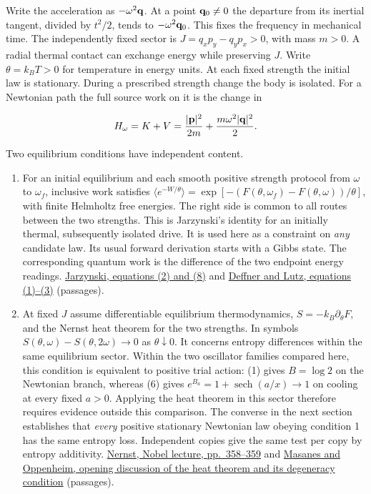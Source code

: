 \documentclass[11pt,a4paper]{article}
\newcommand{\tightlist}{\setlength{\itemsep}{0pt}\setlength{\parskip}{0pt}}
\begin{document}
Write the acceleration as \(-\omega^2 {\bf q}\). At a point
\({\bf q}_0\ne0\) the departure from its inertial tangent, divided by
\(t^2/2\), tends to \(-\omega^2{\bf q}_0\). This fixes the frequency in
mechanical time. The independently fixed sector is
\(J=q_xp_y-q_yp_x>0\), with mass \(m>0\). A radial thermal contact can
exchange energy while preserving \(J\). Write \(\theta=k_BT>0\) for
temperature in energy units. At each fixed strength the initial law is
stationary. During a prescribed strength change the body is isolated.
For a Newtonian path the full source work on it is the change in

\[
 H_\omega=K+V=\frac{|{\bf p}|^2}{2m}
                 +\frac{m\omega^2|{\bf q}|^2}{2}.
\]

Two equilibrium conditions have independent content.

\begin{enumerate}
\def\labelenumi{\arabic{enumi}.}
\tightlist
\item
  For an initial equilibrium and each smooth positive strength protocol
  from \(\omega\) to \(\omega_f\), inclusive work satisfies
  \(\langle e^{-W/\theta}\rangle=\exp[-(F(\theta,\omega_f)-
  F(\theta,\omega))/\theta]\), with finite Helmholtz free energies. The
  right side is common to all routes between the two strengths. This is
  Jarzynski's identity for an initially thermal, subsequently isolated
  drive. It is used here as a constraint on \emph{any} candidate law.
  Its usual forward derivation starts with a Gibbs state. The
  corresponding quantum work is the difference of the two endpoint
  energy readings.
  \href{https://arxiv.org/pdf/cond-mat/9610209}{Jarzynski, equations (2)
  and (8)} and \href{https://arxiv.org/pdf/0711.3914}{Deffner and Lutz,
  equations (1)--(3)} (passages).
\item
  At fixed \(J\) assume differentiable equilibrium thermodynamics,
  \(S=-k_B\partial_\theta F\), and the Nernst heat theorem for the two
  strengths. In symbols \(S(\theta,\omega)-S(\theta,2\omega)\to0\) as
  \(\theta\downarrow0\). It concerns entropy differences within the same
  equilibrium sector. Within the two oscillator families compared here,
  this condition is equivalent to positive trial action: (1) gives
  \(B=\log 2\) on the Newtonian branch, whereas (6) gives
  \(e^{B_a}=1+\operatorname{sech}(a/x)\to1\) on cooling at every fixed
  \(a>0\). Applying the heat theorem in this sector therefore requires
  evidence outside this comparison. The converse in the next section
  establishes that \emph{every} positive stationary Newtonian law
  obeying condition 1 has the same entropy loss. Independent copies give
  the same test per copy by entropy additivity.
  \href{https://www.nobelprize.org/uploads/2017/03/nernst-lecture2.pdf}{Nernst,
  Nobel lecture, pp.~358--359} and
  \href{https://arxiv.org/pdf/1412.3828}{Masanes and Oppenheim, opening
  discussion of the heat theorem and its degeneracy condition}
  (passages).
\end{enumerate}
\end{document}
